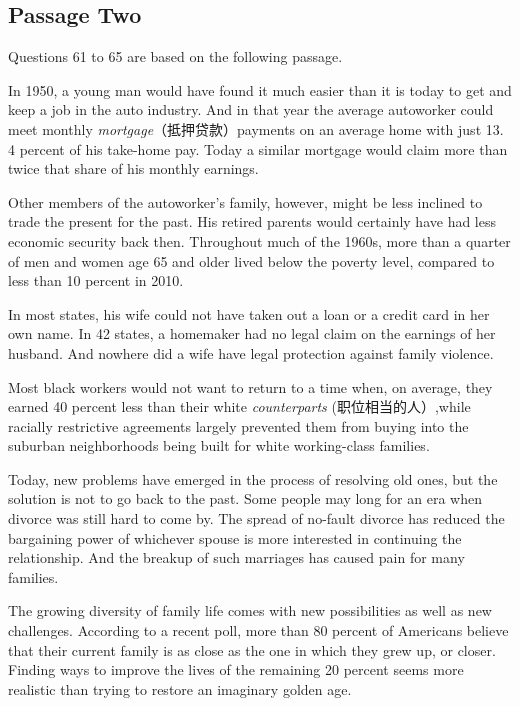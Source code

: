 \documentclass[UTF8,11pt]{ctexart}
\begin{document}
\subsection*{Passage Two}


Questions 61 to 65 are based on the following passage.


In 1950, a young man would have found it much easier than it is today to get and keep a job in the auto industry. And in that year the average autoworker could meet monthly\textit{ mortgage}（抵押贷款）payments on an average home with just 13. 4 percent of his take-home pay. Today a similar mortgage would claim more than twice that share of his monthly earnings.


Other members of the autoworker’s family, however, might be less inclined to trade the present for the past. His retired parents would certainly have had less economic security back then. Throughout much of the 1960s, more than a quarter of men and women age 65 and older lived below the poverty level, compared to less than 10 percent in 2010.


In most states, his wife could not have taken out a loan or a credit card in her own name. In 42 states, a homemaker had no legal claim on the earnings of her husband. And nowhere did a wife have legal protection against family violence.


Most black workers would not want to return to a time when, on average, they earned 40 percent less than their white \textit{counterparts} (职位相当的人）,while racially restrictive agreements largely prevented them from buying into the suburban neighborhoods being built for white working-class families.


Today, new problems have emerged in the process of resolving old ones, but the solution is not to go back to the past. Some people may long for an era when divorce was still hard to come by. The spread of no-fault divorce has reduced the bargaining power of whichever spouse is more interested in continuing the relationship. And the breakup of such marriages has caused pain for many families.


The growing diversity of family life comes with new possibilities as well as new challenges. According to a recent poll, more than 80 percent of Americans believe that their current family is as close as the one in which they grew up, or closer. Finding ways to improve the lives of the remaining 20 percent seems more realistic than trying to restore an imaginary golden age.
\end{document}
